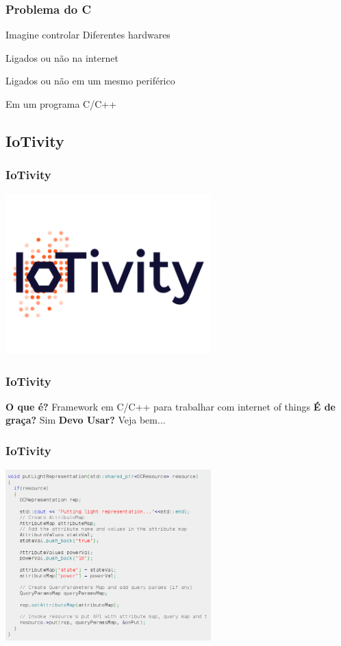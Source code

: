 \documentclass{beamer}
\begin{document}
\begin{frame} \frametitle{ Problema do C }
 Imagine controlar Diferentes hardwares

 Ligados ou não na internet

 Ligados ou não em um mesmo periférico

 Em um programa C/C++
\end{frame}

\subsection{IoTivity}

\begin{frame} \frametitle{ IoTivity }
    \includegraphics[width=300px]{images/iotivity2}
\end{frame}

\begin{frame} \frametitle { IoTivity }
 \textbf{O que é?}
\linebreak
 Framework em C/C++ para trabalhar com internet of things
\linebreak
 \textbf{É de graça?}
\linebreak
 Sim
\linebreak
 \textbf{Devo Usar?}
\linebreak
\pause
 Veja bem...
\end{frame}

\begin{frame} \frametitle{ IoTivity }
    \includegraphics[width=300px]{images/iotivity}
\end{frame}
\end{document}
